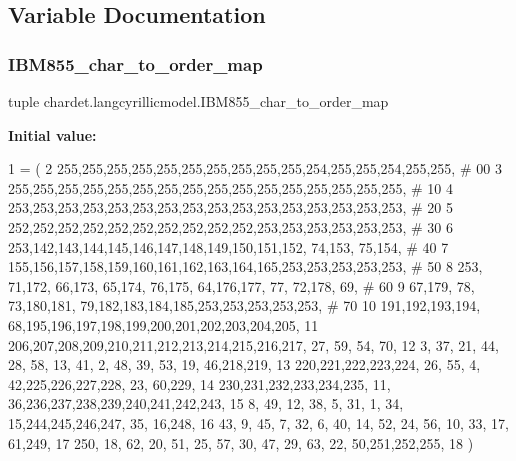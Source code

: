 \subsection{Variable Documentation}
\mbox{\label{namespacechardet_1_1langcyrillicmodel_aa44af53230a94d758b77d7cd94ec3a6d}} 
\subsubsection{\texorpdfstring{I\+B\+M855\+\_\+char\+\_\+to\+\_\+order\+\_\+map}{IBM855\_char\_to\_order\_map}}
{\footnotesize\ttfamily tuple chardet.\+langcyrillicmodel.\+I\+B\+M855\+\_\+char\+\_\+to\+\_\+order\+\_\+map}

{\bfseries Initial value\+:}
\begin{DoxyCode}
1 =  (
2 255,255,255,255,255,255,255,255,255,255,254,255,255,254,255,255,  \textcolor{comment}{# 00}
3 255,255,255,255,255,255,255,255,255,255,255,255,255,255,255,255,  \textcolor{comment}{# 10}
4 253,253,253,253,253,253,253,253,253,253,253,253,253,253,253,253,  \textcolor{comment}{# 20}
5 252,252,252,252,252,252,252,252,252,252,253,253,253,253,253,253,  \textcolor{comment}{# 30}
6 253,142,143,144,145,146,147,148,149,150,151,152, 74,153, 75,154,  \textcolor{comment}{# 40}
7 155,156,157,158,159,160,161,162,163,164,165,253,253,253,253,253,  \textcolor{comment}{# 50}
8 253, 71,172, 66,173, 65,174, 76,175, 64,176,177, 77, 72,178, 69,  \textcolor{comment}{# 60}
9  67,179, 78, 73,180,181, 79,182,183,184,185,253,253,253,253,253,  \textcolor{comment}{# 70}
10 191,192,193,194, 68,195,196,197,198,199,200,201,202,203,204,205,
11 206,207,208,209,210,211,212,213,214,215,216,217, 27, 59, 54, 70,
12   3, 37, 21, 44, 28, 58, 13, 41,  2, 48, 39, 53, 19, 46,218,219,
13 220,221,222,223,224, 26, 55,  4, 42,225,226,227,228, 23, 60,229,
14 230,231,232,233,234,235, 11, 36,236,237,238,239,240,241,242,243,
15   8, 49, 12, 38,  5, 31,  1, 34, 15,244,245,246,247, 35, 16,248,
16  43,  9, 45,  7, 32,  6, 40, 14, 52, 24, 56, 10, 33, 17, 61,249,
17 250, 18, 62, 20, 51, 25, 57, 30, 47, 29, 63, 22, 50,251,252,255,
18 )
\end{DoxyCode}
\mbox{\label{namespacechardet_1_1langcyrillicmodel_aa82f8d589a1f112aea5415a75d0e2a8b}} 
